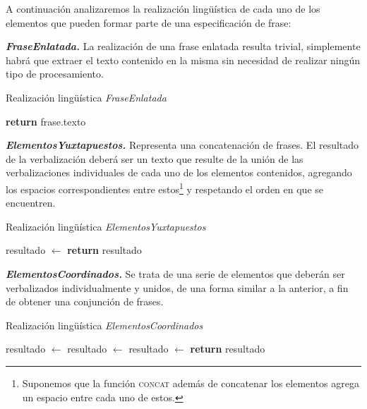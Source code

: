 A continuación analizaremos la realización lingüística de cada uno de los elementos que pueden formar parte de una especificación de frase:

\medskip
\noindent
\textbf{\emph{FraseEnlatada.}} La realización de una frase enlatada resulta trivial, simplemente habrá que extraer el texto contenido en la misma sin necesidad de realizar ningún tipo de procesamiento.

\begin{algorithm}[H]
\caption{Realización lingüística \textit{FraseEnlatada}}
\begin{algorithmic}[1]
\State \textbf{return} frase.texto
\EndFunction
\end{algorithmic}
\end{algorithm}


\medskip
\noindent
\textbf{\emph{ElementosYuxtapuestos.}} Representa una concatenación de frases. El resultado de la verbalización deberá ser un texto que resulte de la unión de las verbalizaciones individuales de cada uno de los elementos contenidos, agregando los espacios correspondientes entre estos\footnote{Suponemos que la función \textsc{concat} además de concatenar los elementos agrega un espacio entre cada uno de estos.} y respetando el orden en que se encuentren. 

\begin{algorithm}[H]
\caption{Realización lingüística \textit{ElementosYuxtapuestos}} 
\begin{algorithmic}[1]
\State resultado $\gets$ 
\EndFor
\State \textbf{return} resultado
\EndFunction
\end{algorithmic}
\end{algorithm}

\medskip
\noindent
\textbf{\emph{ElementosCoordinados.}} Se trata de una serie de elementos que deberán ser verbalizados individualmente y unidos, de una forma similar a la anterior, a fin de obtener una conjunción de frases.

\begin{algorithm}[H]
\caption{Realización lingüística \textit{ElementosCoordinados}}
\begin{algorithmic}[1]
\State resultado $\gets$ 
\State resultado $\gets$ 
\Else
\State resultado $\gets$ 
\EndIf
\EndFor
\State \textbf{return} resultado
\EndFunction
\end{algorithmic}
\end{algorithm}

